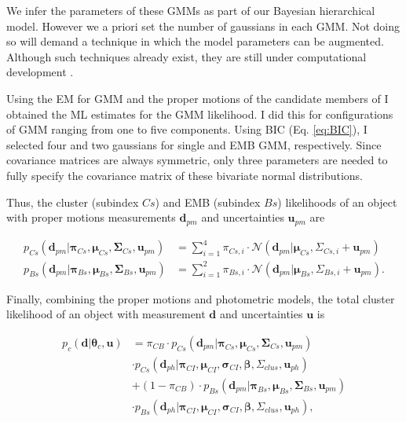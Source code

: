We infer the parameters of these GMMs as part of our Bayesian hierarchical model. However we a priori set the number of gaussians in each GMM. Not doing so will demand a technique in which the model parameters can be augmented. Although such techniques already exist, they are still under computational development \cite[see][for a review of reversible jump MCMC]{Fan2011}.

Using the EM for GMM and the proper motions of the candidate members of \citet{Bouy2015} I obtained the ML estimates for the GMM likelihood. I did this for configurations of GMM ranging from one to five components. Using  BIC (Eq. \ref{eq:BIC}), I selected four and two gaussians for single and EMB GMM, respectively. Since covariance matrices are always symmetric, only three parameters are needed to fully specify the covariance matrix of these bivariate normal distributions.

Thus, the cluster (subindex $Cs$) and EMB (subindex $Bs$) likelihoods of an object with proper motions measurements $\mathbf{d}_{pm}$ and uncertainties $\mathbf{u}_{pm}$ are

\begin{align}
p_{Cs}(\mathbf{d}_{pm}| \boldsymbol{\pi}_{Cs}, \boldsymbol{\mu}_{Cs},\boldsymbol{\Sigma}_{Cs},\mathbf{u}_{pm})
&= \sum_{i=1}^4\pi_{Cs,i}\cdot \mathcal{N}(\mathbf{d}_{pm} | \boldsymbol{\mu}_{Cs},\Sigma_{Cs,i}+\mathbf{u}_{pm}) \nonumber\\
p_{Bs}(\mathbf{d}_{pm}| \boldsymbol{\pi}_{Bs}, \boldsymbol{\mu}_{Bs},\boldsymbol{\Sigma}_{Bs},\mathbf{u}_{pm})
&= \sum_{i=1}^2\pi_{Bs,i}\cdot \mathcal{N}(\mathbf{d}_{pm} | \boldsymbol{\mu}_{Bs},\Sigma_{Bs,i}+\mathbf{u}_{pm}).
\label{eq:lik-pm}
\end{align}

Finally, combining the proper motions and photometric models, the total cluster likelihood of an object with measurement $\mathbf{d}$ and uncertainties $\mathbf{u}$ is

\begin{align}
p_c(\mathbf{d}|\boldsymbol{\theta}_c,\mathbf{u})&=\pi_{CB}\cdot p_{Cs}(\mathbf{d}_{pm}| \boldsymbol{\pi}_{Cs}, \boldsymbol{\mu}_{Cs},\boldsymbol{\Sigma}_{Cs},\mathbf{u}_{pm}) \nonumber \\ &\cdot  p_{Cs}(\mathbf{d}_{ph}|\boldsymbol{\pi}_{CI},\boldsymbol{\mu}_{CI},\boldsymbol{\sigma}_{CI},\boldsymbol{\beta},\Sigma_{clus},\mathbf{u}_{ph})\nonumber\\
&+(1-\pi_{CB})\cdot p_{Bs}(\mathbf{d}_{pm}| \boldsymbol{\pi}_{Bs}, \boldsymbol{\mu}_{Bs},\boldsymbol{\Sigma}_{Bs},\mathbf{u}_{pm}) \nonumber \\
&\cdot  p_{Bs}(\mathbf{d}_{ph}|\boldsymbol{\pi}_{CI},\boldsymbol{\mu}_{CI},\boldsymbol{\sigma}_{CI}, \boldsymbol{\beta},\Sigma_{clus}, \mathbf{u}_{ph}),
\end{align}

